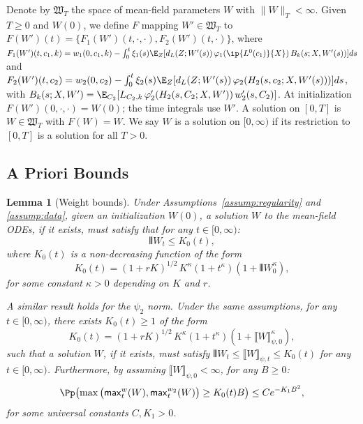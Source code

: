 \documentclass[nohyperref]{article}
\theoremstyle{plain}
\newtheorem{lemma}[theorem]{Lemma}
\theoremstyle{definition}
\theoremstyle{remark}
\begin{document}
Denote by $\mathfrak{W}_T$ the space of mean-field parameters $W$ with $\|W\|_T<\infty$. Given $T\ge 0$ and $W(0)$, we define $F$ mapping $W'\in\mathfrak{W}_T$ to $F(W')(t) = \{F_1(W')(t,\cdot,\cdot), F_2(W')(t,\cdot)\}$, where $F_1(W')(t,c_1,k) = w_1(0,c_1,k) - \int_0^t \xi_1(s)\E_{Z}[d_L(Z;W'(s))\,\varphi_1(\ip{L^0(c_1)}{X})\,B_k(s;X,W'(s))]ds$ and $F_2(W')(t,c_2) = w_2(0,c_2) - \int_0^t \xi_2(s)\E_{Z}[d_L(Z;W'(s))\,\varphi_2(H_2(s,c_2;X,W'(s)))]ds$, with $B_k(s;X,W')=\E_{C_2}[L_{C_2,k}\,\varphi_2'(H_2(s,C_2;X,W'))\,w_2'(s,C_2)]$. At initialization $F(W')(0,\cdot,\cdot)=W(0)$; the time integrals use $W'$. A solution on $[0,T]$ is $W\in\mathfrak{W}_T$ with $F(W)=W$. We say $W$ is a solution on $[0,\infty)$ if its restriction to $[0,T]$ is a solution for all $T>0$.

\subsection{A Priori Bounds}

\begin{lemma}[Weight bounds]
\label{lem:bounds-a-priori}
Under Assumptions~\ref{assump:regularity} and \ref{assump:data}, given an initialization $W(0)$, a solution $W$ to the mean-field ODEs, if it exists, must satisfy that for any $t\in[0,\infty)$:
\[
{\interleave{W}}_t \le K_0(t),
\]
where $K_0(t)$ is a non-decreasing function of the form
\[
K_0(t) = (1+rK)^{1/2}\,K^{\kappa}(1+t^{\kappa})(1+{\interleave{W}}_0^{\kappa}),
\]
for some constant $\kappa>0$ depending on $K$ and $r$.

A similar result holds for the $\psi_2$ norm. Under the same assumptions, for any $t\in[0,\infty)$, there exists $K_0(t)\ge 1$ of the form
\[
K_0(t) = (1+rK)^{1/2}\,K^{\kappa}(1+t^{\kappa})(1+\llbracket W\rrbracket_{\psi,0}^{\kappa}),
\]
such that a solution $W$, if it exists, must satisfy ${\interleave{W}}_t \le \llbracket W\rrbracket_{\psi,t} \le K_0(t)$ for any $t\in[0,\infty)$. Furthermore, by assuming $\llbracket W\rrbracket_{\psi,0}<\infty$, for any $B\ge 0$:
\[
\Pp\!\left(\max\big(\mathsf{max}_t^w(W), \mathsf{max}_t^{w_2}(W)\big)\ge K_0(t)B\right) \le C e^{-K_1 B^2},
\]
for some universal constants $C, K_1>0$.
\end{lemma}
\end{document}
